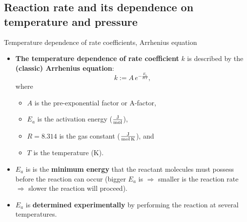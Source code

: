 \subsection{Reaction rate and its dependence on temperature and pressure}
\begin{frame}{Temperature dependence of rate coefficients, Arrhenius equation}
	\begin{itemize}
		\item {\bf The temperature dependence of rate coefficient} $k$ is	described by the \alert{\bf (classic) Arrhenius equation}:
		\[
		k := A\, e^{-\tfrac{E_a}{R\, T}},\]
		where 
		\begin{itemize}
			\item $A$ is the pre-exponential factor or A-factor,
			\item $E_a$ is the activation energy ($\tfrac{\rm J}{\rm mol}$), 
			\item $R = 8.314$ is the gas constant ($\tfrac{\rm J}{\rm mol \, K}$), and 
			\item $T$ is the temperature (K).
		\end{itemize}
		\pause
		\item $E_a$ is is the {\bf minimum energy} that the reactant molecules must possess before the reaction can occur (bigger $E_a$ is $\Rightarrow$ smaller is the reaction rate $\Rightarrow$ slower the reaction will proceed).
		\pause
		\item $E_a$ is {\bf determined experimentally} by performing the reaction at several temperatures. 
	\end{itemize}
\end{frame}
%
%
%
